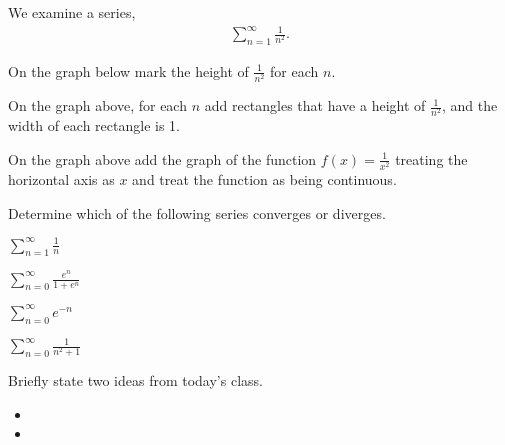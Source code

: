 \begin{problem}
\item We examine a series,
\begin{eqnarray*}
  \sum^\infty_{n=1} \frac{1}{n^2}.
\end{eqnarray*}
  \begin{subproblem}
  \item On the graph below mark the height of $\frac{1}{n^2}$ for each $n$.\\[10pt]
  \centerline{\scalebox{1.0}{}}
  \item On the graph above, for each $n$ add rectangles that have a height of $\frac{1}{n^2}$,
  and the width of each rectangle is 1.
  \item On the graph above add the graph of the function ${\displaystyle f(x)=\frac{1}{x^2}}$ treating the horizontal
  axis as $x$ and treat the function as being continuous.
  \end{subproblem}
\end{problem}


\begin{problem}
\item Determine which of the following series converges or
  diverges.
  \begin{subproblem}
    \item $\sum_{n=1}^\infty \frac{1}{n}$
      \vfill
    \item $\sum_{n=0}^\infty \frac{e^n}{1+e^n}$
      \vfill
      \clearpage
    \item $\sum_{n=0}^\infty e^{-n}$
      \vfill
    \item $\sum_{n=0}^\infty \frac{1}{n^2+1}$
      \vfill
  \end{subproblem}
\end{problem}


\postClass

\begin{problem}
\item Briefly state two ideas from today's class.
  \begin{itemize}
  \item
  \item
  \end{itemize}
\item
  \begin{subproblem}
    \item
  \end{subproblem}
\end{problem}



